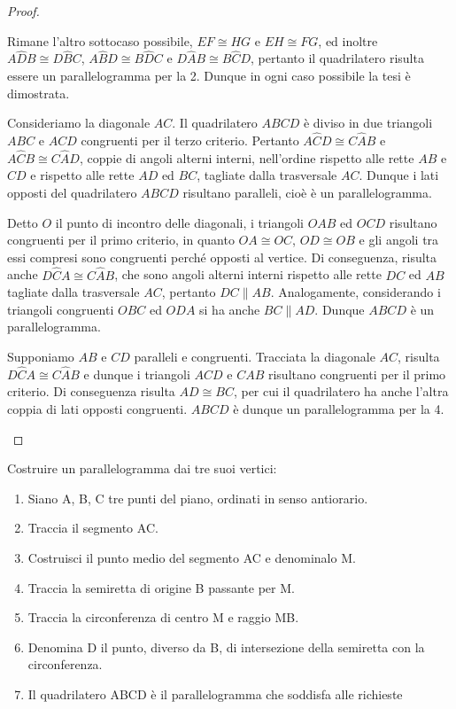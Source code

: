 \begin{proof}
\begin{enumerate*}
    Rimane l'altro sottocaso possibile, $EF\cong HG$ e $EH\cong FG$, ed 
    inoltre $A\widehat{D}B\cong D\widehat{B}C$, $A\widehat{B}D\cong 
    B\widehat{D}C$ e $D\widehat{A}B\cong B\widehat{C}D$, pertanto il 
    quadrilatero risulta essere un parallelogramma per la 2. Dunque in 
    ogni caso possibile la tesi è dimostrata.
    \item Consideriamo la diagonale $AC$. Il quadrilatero $ABCD$ è diviso 
    in due triangoli $ABC$ e $ACD$ congruenti per il terzo criterio. 
    Pertanto $A\widehat{C}D\cong C\widehat{A}B$ e $A\widehat{C}B\cong 
    C\widehat{A}D$, coppie di angoli alterni interni, nell'ordine 
    rispetto alle rette $AB$ e $CD$ e rispetto alle rette $AD$ ed $BC$, 
    tagliate dalla trasversale $AC$. Dunque i lati opposti del 
    quadrilatero $ABCD$ risultano paralleli, cioè è un parallelogramma.
    \item Detto $O$ il punto di incontro delle diagonali, i triangoli 
    $OAB$ ed $OCD$ risultano congruenti per il primo criterio, in quanto 
    $OA\cong OC$, $OD\cong OB$ e gli angoli tra essi compresi sono 
    congruenti perché opposti al vertice. Di conseguenza, risulta anche 
    $D\widehat{C}A\cong C\widehat{A}B$, che sono angoli alterni interni 
    rispetto alle rette $DC$ ed $AB$ tagliate dalla trasversale $AC$, 
    pertanto $DC\parallel AB$. Analogamente, considerando i triangoli 
    congruenti $OBC$ ed $ODA$ si ha anche $BC\parallel AD$. Dunque $ABCD$ 
    è un parallelogramma.
    \item Supponiamo $AB$ e $CD$ paralleli e congruenti. Tracciata la 
    diagonale $AC$, risulta $D\widehat{C}A\cong C\widehat{A}B$ e dunque i 
    triangoli $ACD$ e $CAB$ risultano congruenti per il primo criterio. 
    Di conseguenza risulta $AD\cong BC$, per cui il quadrilatero ha anche 
    l'altra coppia di lati opposti congruenti. $ABCD$ è dunque un 
    parallelogramma per la 4.
  \end{enumerate*}
\end{proof}


\begin{procedura}
  Costruire un parallelogramma dai tre suoi vertici:
  \begin{enumerate} [nosep]
    \item 
    Siano A, B, C tre punti del piano, ordinati in senso antiorario.
    \item 
    Traccia il segmento AC.
    \item 
    Costruisci il punto medio del segmento AC e denominalo M.
    \item 
    Traccia la semiretta di origine B passante per M.
    \item 
    Tracci­a la circonferenza di centro M e raggio MB.
    \item 
    Denomina D il punto,  diverso da B, di intersezione della semiretta con la 
circonferenza.
    \item 
    Il quadrilatero ABCD è il parallelogramma che soddisfa alle richieste
  \end{enumerate}
\end{procedura}


